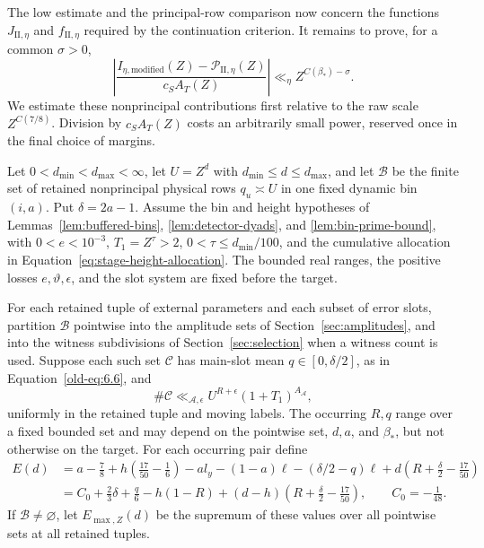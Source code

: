 The low estimate and the principal-row comparison now concern the functions
$J_{\mathrm{II},\eta}$ and $f_{\mathrm{II},\eta}$ required by the continuation
criterion. It remains to prove, for a common $\sigma>0$,
\[
 \left|\frac{I_{\eta,\mathrm{modified}}(Z)
                -\mathscr P_{\mathrm{II},\eta}(Z)}{c_S A_T(Z)}\right|
 \ll_\eta Z^{C(\beta_*)-\sigma}.
\]
We estimate these nonprincipal contributions first relative to the raw
scale $Z^{C(7/8)}$. Division by $c_S A_T(Z)$ costs an arbitrarily small
power, reserved once in the final choice of margins.


\begin{lemma}\label{lem:high-bin}
Let \(0<d_{\min}<d_{\max}<\infty\), let \(U=Z^d\) with
\(d_{\min}\le d\le d_{\max}\), and let
\(\mathcal B\) be the finite set of retained nonprincipal physical rows
\(q_u\asymp U\) in one fixed dynamic bin \((i,a)\).  Put
\(\delta=2a-1\).  Assume the bin and height hypotheses of
Lemmas~\ref{lem:buffered-bins}, \ref{lem:detector-dyads}, and
\ref{lem:bin-prime-bound}, with
\(0<e<10^{-3}\), \(T_1=Z^\tau>2\), \(0<\tau\le d_{\min}/100\), and the cumulative
allocation in Equation~\eqref{eq:stage-height-allocation}.
The bounded real ranges, the positive losses \(e,\vartheta,\epsilon\), and the
slot system are fixed before the target.

For each retained tuple of external parameters and each subset of error
slots, partition \(\mathcal B\) pointwise into the amplitude sets of
Section~\ref{sec:amplitudes}, and into the witness subdivisions of
Section~\ref{sec:selection} when a witness count is used.  Suppose each
such set \(\mathcal C\) has main-slot mean \(q\in[0,\delta/2]\), as in
Equation~\eqref{old-eq:6.6}, and
\[
 \#\mathcal C\ll_{\mathcal A,\epsilon}
 U^{R+\epsilon}(1+T_1)^{A_{\mathcal A}},
\]
uniformly in the retained tuple and moving labels.  The occurring \(R,q\)
range over a fixed bounded set and may depend on the pointwise set, \(d,a\),
and \(\beta_*\), but not otherwise on the target.  For each occurring pair
define
\begin{equation}\label{eq:common-high-exponent}
 \begin{split}
 E(d)
 &=a-\frac78+h\left(\frac{17}{50}-\frac16\right)
       -a l_y-(1-a)\ell-(\delta/2-q)\ell
       +d\left(R+\frac\delta2-\frac{17}{50}\right)\\
 &=C_0+\frac23\delta+\frac q6-h(1-R)
       +(d-h)\left(R+\frac\delta2-\frac{17}{50}\right),
       \qquad C_0=-\frac1{48}.
 \end{split}
\end{equation}
If \(\mathcal B\ne\varnothing\), let \(E_{\max,Z}(d)\) be the supremum
of these values over all pointwise sets at all retained tuples.


\end{lemma}
